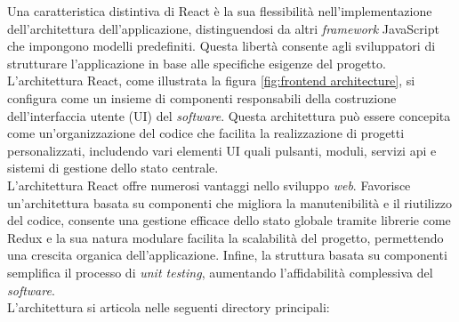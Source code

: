 Una caratteristica distintiva di React è la sua flessibilità nell'implementazione dell'architettura dell'applicazione, 
distinguendosi da altri \textit{framework} JavaScript che impongono modelli predefiniti. Questa libertà consente 
agli sviluppatori di strutturare l'applicazione in base alle specifiche esigenze del progetto.\\
L'architettura React, come illustrata la figura \ref{fig:frontend architecture}, si configura come un insieme di 
componenti responsabili della costruzione dell'interfaccia utente (UI) del \textit{software}. Questa architettura 
può essere concepita come un'organizzazione del codice che facilita la realizzazione di progetti personalizzati, 
includendo vari elementi UI quali pulsanti, moduli, servizi \gls{api} e sistemi di gestione dello stato centrale.\\
L'architettura React offre numerosi vantaggi nello sviluppo \textit{web}. Favorisce un'architettura basata su componenti 
che migliora la manutenibilità e il riutilizzo del codice, consente una gestione efficace dello stato globale tramite 
librerie come Redux e la sua natura modulare facilita la scalabilità del progetto, permettendo una crescita organica 
dell'applicazione. Infine, la struttura basata su componenti semplifica il processo di \textit{unit testing}, aumentando 
l'affidabilità complessiva del \textit{software}.\\
L'architettura si articola nelle seguenti directory principali:

